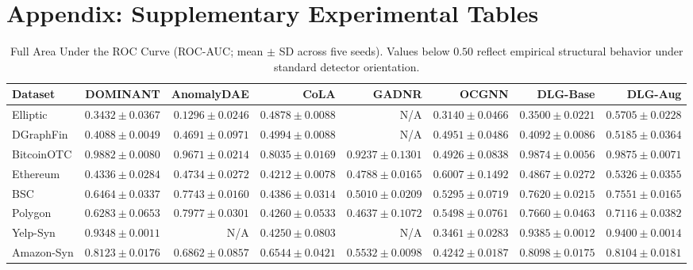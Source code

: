 \documentclass[11pt,a4paper]{article}
\begin{document}



\newpage
\appendix
\section*{Appendix: Supplementary Experimental Tables}
\label{sec:appendix}

\renewcommand{\thetable}{A\arabic{table}}
\setcounter{table}{0}

\begin{table}[H]
\centering\fontsize{7.2pt}{8.5pt}\selectfont\setlength{\tabcolsep}{1.2pt}
\caption{Full Area Under the ROC Curve (ROC-AUC; mean $\pm$ SD across five seeds). Values below $0.50$ reflect empirical structural behavior under standard detector orientation.}
\label{tab:app_roc_auc_full}
\begin{tabular*}{\textwidth}{@{\extracolsep{\fill}}lrrrrrrr}\toprule
\textbf{Dataset} & \textbf{DOMINANT} & \textbf{AnomalyDAE} & \textbf{CoLA} & \textbf{GADNR} & \textbf{OCGNN} & \textbf{DLG-Base} & \textbf{DLG-Aug} \\\midrule
Elliptic & $0.3432 \pm 0.0367$ & $0.1296 \pm 0.0246$ & $0.4878 \pm 0.0088$ & N/A & $0.3140 \pm 0.0466$ & $0.3500 \pm 0.0221$ & $\mathbf{0.5705 \pm 0.0228}$ \\
DGraphFin & $0.4088 \pm 0.0049$ & $0.4691 \pm 0.0971$ & $0.4994 \pm 0.0088$ & N/A & $0.4951 \pm 0.0486$ & $0.4092 \pm 0.0086$ & $\mathbf{0.5185 \pm 0.0364}$ \\
BitcoinOTC & $\mathbf{0.9882 \pm 0.0080}$ & $0.9671 \pm 0.0214$ & $0.8035 \pm 0.0169$ & $0.9237 \pm 0.1301$ & $0.4926 \pm 0.0838$ & $0.9874 \pm 0.0056$ & $0.9875 \pm 0.0071$ \\
Ethereum & $0.4336 \pm 0.0284$ & $0.4734 \pm 0.0272$ & $0.4212 \pm 0.0078$ & $0.4788 \pm 0.0165$ & $\mathbf{0.6007 \pm 0.1492}$ & $0.4867 \pm 0.0272$ & $0.5326 \pm 0.0355$ \\
BSC & $0.6464 \pm 0.0337$ & $\mathbf{0.7743 \pm 0.0160}$ & $0.4386 \pm 0.0314$ & $0.5010 \pm 0.0209$ & $0.5295 \pm 0.0719$ & $0.7620 \pm 0.0215$ & $0.7551 \pm 0.0165$ \\
Polygon & $0.6283 \pm 0.0653$ & $\mathbf{0.7977 \pm 0.0301}$ & $0.4260 \pm 0.0533$ & $0.4637 \pm 0.1072$ & $0.5498 \pm 0.0761$ & $0.7660 \pm 0.0463$ & $0.7116 \pm 0.0382$ \\
Yelp-Syn & $0.9348 \pm 0.0011$ & N/A & $0.4250 \pm 0.0803$ & N/A & $0.3461 \pm 0.0283$ & $0.9385 \pm 0.0012$ & $\mathbf{0.9400 \pm 0.0014}$ \\
Amazon-Syn & $\mathbf{0.8123 \pm 0.0176}$ & $0.6862 \pm 0.0857$ & $0.6544 \pm 0.0421$ & $0.5532 \pm 0.0098$ & $0.4242 \pm 0.0187$ & $0.8098 \pm 0.0175$ & $0.8104 \pm 0.0181$ \\

\end{tabular*}
\end{table}
\end{document}
